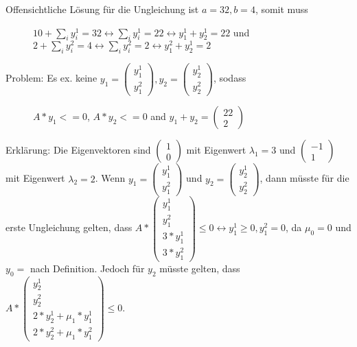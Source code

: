 \begin{itemize}
		\newline
		Offensichtliche Lösung für die Ungleichung ist $a=32, b=4$, somit muss 
			\begin{figure}[H] 
				\centering 
				$10 + \sum_{i}y_i^1=32 \leftrightarrow \sum_{i}y_i^1=22 \leftrightarrow y_1^1+y_2^1=22$ und \\
				$2 + \sum_{i}y_i^2 = 4 \leftrightarrow \sum_{i}y_i^2=2 \leftrightarrow y_1^2+y_2^1=2$			
			\end{figure}
		Problem: \newline
		 Es ex. keine $y_1=\begin{pmatrix} y_1^1 \\ y_1^2 \end{pmatrix}, y_2=\begin{pmatrix} y_2^1 \\ y_2^2 \end{pmatrix}$, sodass
			\begin{figure}[H]
				\centering
				$A*y_1<=0$, $ A*y_2<=0$ and $y_1+y_2=\begin{pmatrix} 22 \\ 2 \end{pmatrix}$
			\end{figure}
		Erklärung:\newline
		Die Eigenvektoren sind $\begin{pmatrix} 1 \\ 0 \end{pmatrix}$ mit Eigenwert $\lambda_1=3$ und $\begin{pmatrix} -1 \\ 1 \end{pmatrix}$ mit Eigenwert $\lambda_2=2 $. Wenn $y_1=\begin{pmatrix} y_1^1 \\ y_1^2 \end{pmatrix}$ und $y_2=\begin{pmatrix} y_2^1 \\ y_2^2 \end{pmatrix}$, dann müsste für die erste Ungleichung gelten, dass $A*\begin{pmatrix} y_1^1 \\ y_1^2 \\ 3*y_1^1 \\ 3*y_1^2 \end{pmatrix}\le 0 \leftrightarrow y_1^1 \ge 0, y_1^2 = 0$, da $\mu_0 = 0$ und $y_0 = $ nach Definition.\newline
		Jedoch für $y_2$ müsste gelten, dass $A*\begin{pmatrix} y_2^1 \\ y_2^2 \\ 2*y_2^1 + \mu_1*y_1^1\\ 2*y_2^2 + \mu_1*y_1^2 \end{pmatrix}\le 0$. \newline

\end{itemize}
